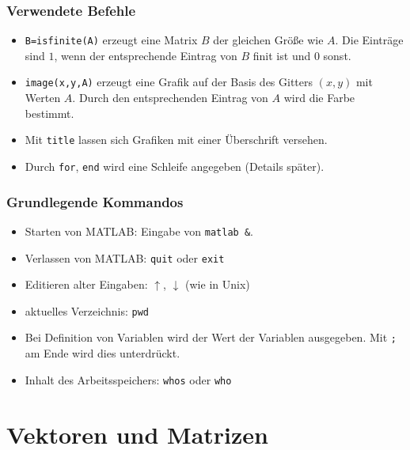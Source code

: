 \begin{frame}[fragile]\frametitle{Verwendete Befehle}
\begin{itemize}
\item \lstinline!B=isfinite(A)! erzeugt eine Matrix $B$ der gleichen Gr\"o{\ss}e
  wie $A$. Die Einträge sind $1$, wenn der entsprechende Eintrag von $B$ finit
  ist und $0$ sonst.  
\item \lstinline!image(x,y,A)! erzeugt eine Grafik auf der Basis des Gitters
  $(x,y)$ mit Werten $A$. Durch den entsprechenden Eintrag von $A$ wird die
  Farbe bestimmt.  
\item Mit \lstinline!title! lassen sich Grafiken mit einer Überschrift
versehen.  
\item Durch \lstinline!for!, \lstinline!end! wird eine Schleife angegeben
(Details später).
\end{itemize}
\end{frame}
\begin{frame}[fragile]\frametitle{Grundlegende Kommandos}
\begin{itemize}
\item Starten von MATLAB: Eingabe von \lstinline!matlab &!.
\item Verlassen von MATLAB: \lstinline!quit! oder \lstinline!exit!
\item Editieren alter Eingaben:  $\uparrow$, $\downarrow$ (wie
in Unix)
\item aktuelles Verzeichnis: \lstinline!pwd!
\item Bei Definition von Variablen wird der Wert der Variablen
ausgegeben. Mit \lstinline!;! am Ende wird dies unterdrückt.
\item Inhalt des Arbeitsspeichers: \lstinline!whos! oder \lstinline!who!
\end{itemize}
\end{frame}

\section{Vektoren und Matrizen}


%


